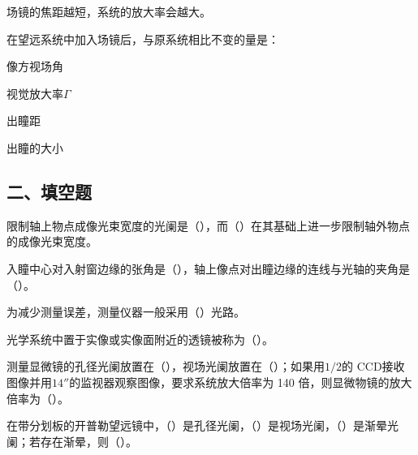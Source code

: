 \documentclass[standard, analysis, notocnum]{ExBook}
\newcommand{\answerarea}[1][8cm]{%
  \par\vspace{2mm}%
  \noindent{\color{themeColor!35}\rule{\linewidth}{0.4pt}}\par
  \noindent\begin{minipage}[t][#1][t]{\linewidth}\vspace{0pt}\end{minipage}\par
  \noindent{\color{themeColor!35}\rule{\linewidth}{0.4pt}}\par
}
\begin{document}
\begin{qitems}
\begin{bbox}
\par\noindent\hspace{2em}场镜的焦距越短，系统的放大率会越大。
\answerarea[3.5cm]
\end{bbox}
\begin{bbox}
\qitem 在望远系统中加入场镜后，与原系统相比不变的量是：
\par\noindent\hspace{2em}像方视场角
\par\noindent\hspace{2em}视觉放大率$\Gamma$
\par\noindent\hspace{2em}出瞳距
\par\noindent\hspace{2em}出瞳的大小
\answerarea[3.5cm]
\end{bbox}
\end{qitems}

\subsection{二、填空题}
\begin{qitems}
\begin{bbox}
\qitem 限制轴上物点成像光束宽度的光阑是（\hspace{1.6em}），而（\hspace{1.6em}）在其基础上进一步限制轴外物点的成像光束宽度。
\answerarea[3.5cm]
\end{bbox}
\begin{bbox}
\qitem 入瞳中心对入射窗边缘的张角是（\hspace{1.6em}），轴上像点对出瞳边缘的连线与光轴的夹角是（\hspace{1.6em}）。
\answerarea[3.5cm]
\end{bbox}
\begin{bbox}
\qitem 为减少测量误差，测量仪器一般采用（\hspace{1.6em}）光路。
\answerarea[3.5cm]
\end{bbox}
\begin{bbox}
\qitem 光学系统中置于实像或实像面附近的透镜被称为（\hspace{1.6em}）。
\answerarea[3.5cm]
\end{bbox}
\begin{bbox}
\qitem 测量显微镜的孔径光阑放置在（\hspace{1.6em}），视场光阑放置在（\hspace{1.6em}）；如果用$1/2$的 CCD接收图像并用$14''$的监视器观察图像，要求系统放大倍率为 140 倍，则显微物镜的放大倍率为（\hspace{1.6em}）。
\answerarea[3.5cm]
\end{bbox}
\begin{bbox}
\qitem 在带分划板的开普勒望远镜中，（\hspace{1.6em}）是孔径光阑，（\hspace{1.6em}）是视场光阑，（\hspace{1.6em}）是渐晕光阑；若存在渐晕，则（\hspace{1.6em}）。
\answerarea[3.5cm]
\end{bbox}
\end{qitems}
\end{document}
